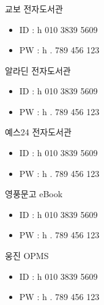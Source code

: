 \documentclass[aspectratio=1610,17pt,xcolor=pdftex,dvipsnames,table,handout]{beamer}
\begin{document}
		\begin{frame} [t,plain]
		\frametitle{}

			\begin{block} {교보 전자도서관}
			\setlength{\leftmargini}{4em}			
			\begin{itemize}
				\item ID : h 010 3839 5609
				\item PW : h . 789 456 123
			\end{itemize}
			\end{block}						

			\begin{block} {알라딘 전자도서관}
			\setlength{\leftmargini}{4em}			
			\begin{itemize}
				\item ID : h 010 3839 5609
				\item PW : h . 789 456 123
			\end{itemize}
			\end{block}						

			\begin{block} {예스24 전자도서관}
			\setlength{\leftmargini}{4em}			
			\begin{itemize}
				\item ID : h 010 3839 5609
				\item PW : h . 789 456 123
			\end{itemize}
			\end{block}						

			\begin{block} {영풍문고 eBook}
			\setlength{\leftmargini}{4em}			
			\begin{itemize}
				\item ID : h 010 3839 5609
				\item PW : h . 789 456 123
			\end{itemize}
			\end{block}						

			\begin{block} {웅진 OPMS}
			\setlength{\leftmargini}{4em}			
			\begin{itemize}
				\item ID : h 010 3839 5609
				\item PW : h . 789 456 123
			\end{itemize}
			\end{block}						

		\end{frame}						
\end{document}
